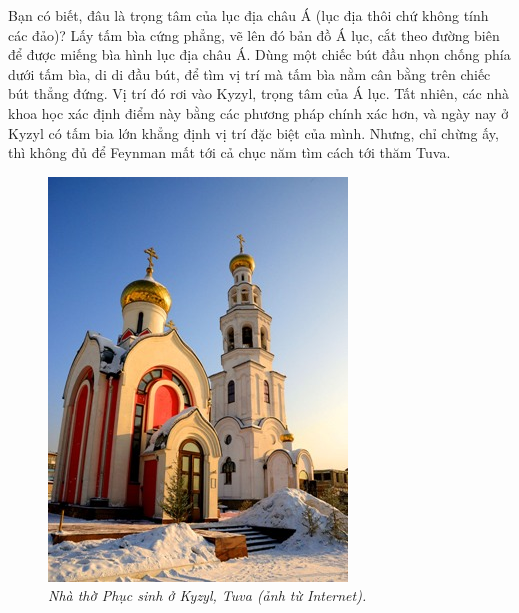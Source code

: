 \begin{multicols}{2}
	\vskip 0.1cm
	Bạn có biết, đâu là trọng tâm của lục địa châu Á (lục địa thôi chứ không tính các đảo)? Lấy tấm bìa cứng phẳng, vẽ lên đó bản đồ Á lục, cắt theo đường biên để được miếng bìa hình lục địa châu Á. Dùng một chiếc bút đầu nhọn chống phía dưới tấm bìa, di di đầu bút, để tìm vị trí mà tấm bìa nằm cân bằng trên chiếc bút thẳng đứng. Vị trí đó rơi vào Kyzyl, trọng tâm của Á lục. Tất nhiên, các nhà khoa học xác định điểm này bằng các phương pháp chính xác hơn, và ngày nay ở Kyzyl có tấm bia lớn khẳng định vị trí đặc biệt của mình. Nhưng, chỉ chừng ấy, thì không đủ để Feynman mất tới cả chục năm tìm cách tới thăm Tuva.
	\begin{figure}[H]
		\vspace*{-5pt}
		\centering
		\captionsetup{labelformat= empty, justification=centering}
		\includegraphics[width= 1\linewidth]{4a}
		\caption{\small\textit{\color{quantoan}Nhà thờ Phục sinh ở Kyzyl, Tuva (ảnh từ Internet).}}
		\vspace*{-10pt}

\end{figure}
\end{multicols}
